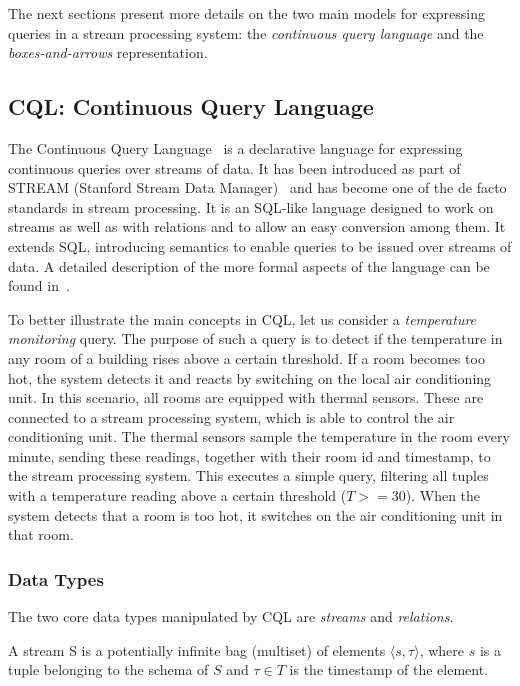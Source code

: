 The next sections present more details on the two main models for expressing queries in a
stream processing system: the \emph{continuous query language} and the \emph{boxes-and-arrows}
representation.

\subsection*{CQL: Continuous Query Language}
\label{sec:cql}

The Continuous Query Language~\cite{cql} is a declarative language for expressing continuous queries
over streams of data. It has been introduced as part of STREAM (Stanford Stream Data
Manager)~\cite{stream} and has become one of the de facto standards in stream processing. It is an
SQL-like language designed to work on streams as well as with relations and to allow an easy conversion
among them. It extends SQL, introducing semantics to enable queries to be issued over streams of data. A detailed description of the
more formal aspects of the language can be found in~\cite{cql-foundation}. 

To better illustrate the main concepts in CQL, let us consider a \textit{temperature monitoring} query.
The purpose of such a query is to detect if the temperature in any room of a building rises above a
certain threshold. If a room becomes too hot, the system detects it and reacts by switching on the local
air conditioning unit. In this scenario, all rooms are equipped with thermal sensors.
These are connected to a stream processing system, which is able to control the air conditioning unit.
The thermal sensors sample the temperature in the room every minute, sending these readings, together with
their room id and timestamp, to the stream processing system. This executes a simple query, filtering
all tuples with a temperature reading above a certain threshold (\eg $T>=30$). When the system
detects that a room is too hot, it switches on the air conditioning unit in that room. 
\subsubsection*{Data Types}

The two core data types manipulated by CQL are \textit{streams} and \textit{relations}.

\begin{definition}[Stream]{A stream S is a potentially infinite bag (multiset) of elements $\langle s,
\tau \rangle$, where $s$ is a tuple belonging to the schema of $S$ and $τ ∈ T$ is the timestamp of the element.}
\end{definition}


